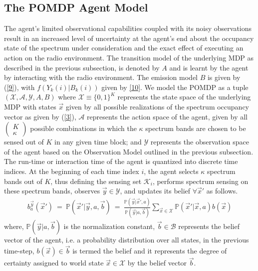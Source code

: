 \documentclass[10pt,twocolumn]{IEEEtran}
\begin{document}
\subsection{The POMDP Agent Model}
The agent's limited observational capabilities coupled with its noisy observations result in an increased level of uncertainty at the agent's end about the occupancy state of the spectrum under consideration and the exact effect of executing an action on the radio environment. The transition model of the underlying MDP as described in the previous subsection, is denoted by $A$ and is learnt by the agent by interacting with the radio environment. The emission model $B$ is given by (\ref{9}), with $f(Y_k(i)|B_k(i))$ given by \eqref{10}. We model the POMDP as a tuple $(\mathcal{X},\mathcal{A},\mathcal{Y},A,B)$ where $\mathcal{X}\equiv\{0,1\}^K$ represents the state space of the underlying MDP with states $\vec{x}$ given by all possible realizations of the spectrum occupancy vector as given by (\ref{3}), $\mathcal{A}$ represents the action space of the agent, given by all $\left(\begin{array}{c}K\\\kappa\end{array}\right)$ possible combinations in which the $\kappa$ spectrum bands are chosen to be sensed out of $K$ in any given time block; and $\mathcal{Y}$ represents the observation space of the agent based on the Observation Model outlined in the previous subsection. The run-time or interaction time of the agent is quantized into discrete time indices. At the beginning of each time index $i$, the agent selects $\kappa$ spectrum bands out of $K$, thus defining the sensing set $\mathcal K_i$, performs spectrum sensing  on these spectrum bands, observes $\vec{y} \in \mathcal{Y}$, and updates its belief $\forall \vec{x}'$ as follows.
\begin{equation}\label{11}
    \begin{aligned}
        b_a^{\vec{y}}(\vec{x}')\ =\ \mathbb{P}(\vec{x}'|\vec{y},a,\vec{b})\ =\ \frac{\mathbb{P}(\vec{y}|\vec{x}',a)}{\mathbb{P}(\vec{y}|a,\vec{b})}\sum_{\vec{x} \in \mathcal{X}}\mathbb{P}(\vec{x}'|\vec{x},a)b(\vec{x})
    \end{aligned}
\end{equation}
where, $\mathbb{P}(\vec{y}|a,\vec{b})$ is the normalization constant, $\vec{b} \in \mathcal{B}$ represents the belief vector of the agent, i.e. a probability distribution over all states, in the previous time-step, $b(\vec{x}) \in \vec{b}$ is termed the belief and it represents the degree of certainty assigned to world state $\vec{x} \in \mathcal{X}$ by the belief vector $\vec{b}$.
\end{document}
